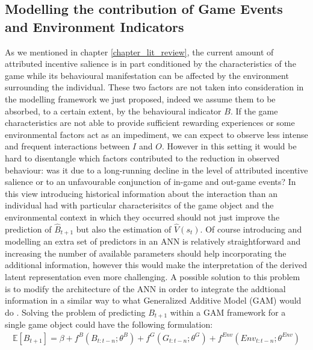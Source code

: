 \subsection{Modelling the contribution of Game Events and Environment Indicators}
\label{modelling_env_and_game_elements}
As we mentioned in chapter \ref{chapter_lit_review}, the current amount of attributed incentive salience is in part conditioned by the characteristics of the game while its behavioural manifestation can be affected by the environment surrounding the individual. These two factors are not taken into consideration in the modelling framework we just proposed, indeed we assume them to be absorbed, to a certain extent, by the behavioural indicator $B$. If the game characteristics are not able to provide sufficient rewarding experiences or some environmental factors act as an impediment, we can expect to observe less intense and frequent interactions between $I$ and $O$. However in this setting it would be hard to disentangle which factors contributed to the reduction in observed behaviour: was it due to a long-running decline in the level of attributed incentive salience or to an unfavourable conjunction of in-game and out-game events? In this view introducing historical information about the interaction than an individual had with particular characterisitcs of the game object and the environmental context in which they occurred should not just improve the prediction of $\widehat{B}_{t+1}$ but also the estimation of $\widehat{V}(s_t)$. Of course introducing and modelling an extra set of predictors in an ANN is relatively straightforward and increasing the number of available parameters should help incorporating the additional information, however this would make the interpretation of the derived latent representation even more challenging. A possible solution to this problem is to modify the architecture of the ANN in order to integrate the addtional information in a similar way to what Generalized Additive Model (GAM) would do \cite{hastie2017generalized}. Solving the problem of predicting $B_{t+1}$ within a GAM framework for a single game object could have the following formulation:
\begin{gather}
\label{gam}
    \mathbb{E}[{B}_{t+1}] = \beta + f^{B}(B_{t:t-n};\theta^{B}) + f^{G}(G_{t:t-n};\theta^{G}) + f^{Env}(Env_{t:t-n};\theta^{Env})
\end{gather}

